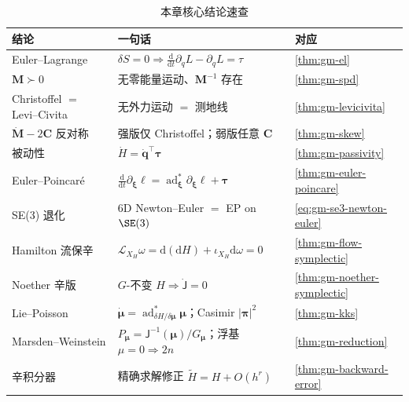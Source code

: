 \begin{table}[H]\centering\small
\caption{本章核心结论速查}
\label{tab:gm-summary}
\begin{tabular}{lll}
\toprule
结论 & 一句话 & 对应\\
\midrule
Euler--Lagrange & $\delta S=0\Rightarrow\tfrac{\mathrm d}{\mathrm dt}\partial_{\dot q}L-\partial_q L=\tau$ & \cref{thm:gm-el}\\
$\mathbf M\succ0$ & 无零能量运动、$\mathbf M^{-1}$ 存在 & \cref{thm:gm-spd}\\
Christoffel $=$ Levi--Civita & 无外力运动 $=$ 测地线 & \cref{thm:gm-levicivita}\\
$\dot{\mathbf M}-2\mathbf C$ 反对称 & 强版仅 Christoffel；弱版任意 $\mathbf C$ & \cref{thm:gm-skew}\\
被动性 & $\dot H=\dot{\mathbf q}^\top\boldsymbol\tau$ & \cref{thm:gm-passivity}\\
Euler--Poincaré & $\tfrac{\mathrm d}{\mathrm dt}\partial_{\boldsymbol\xi}\ell=\operatorname{ad}^*_{\boldsymbol\xi}\partial_{\boldsymbol\xi}\ell+\boldsymbol\tau$ & \cref{thm:gm-euler-poincare}\\
SE(3) 退化 & $6$D Newton--Euler $=$ EP on $\SE(3)$ & \cref{eq:gm-se3-newton-euler}\\
Hamilton 流保辛 & $\mathcal L_{X_H}\omega=\mathrm d(\mathrm dH)+\iota_{X_H}\mathrm d\omega=0$ & \cref{thm:gm-flow-symplectic}\\
Noether 辛版 & $G$-不变 $H\Rightarrow\dot{\mathsf J}=0$ & \cref{thm:gm-noether-symplectic}\\
Lie--Poisson & $\dot{\boldsymbol\mu}=\operatorname{ad}^*_{\delta H/\delta\boldsymbol\mu}\boldsymbol\mu$；Casimir $|\boldsymbol\pi|^2$ & \cref{thm:gm-kks}\\
Marsden--Weinstein & $P_{\boldsymbol\mu}=\mathsf J^{-1}(\boldsymbol\mu)/G_{\boldsymbol\mu}$；浮基 $\mu{=}0\Rightarrow2n$ & \cref{thm:gm-reduction}\\
辛积分器 & 精确求解修正 $\tilde H=H+O(h^r)$ & \cref{thm:gm-backward-error}\\
\bottomrule
\end{tabular}
\end{table}


